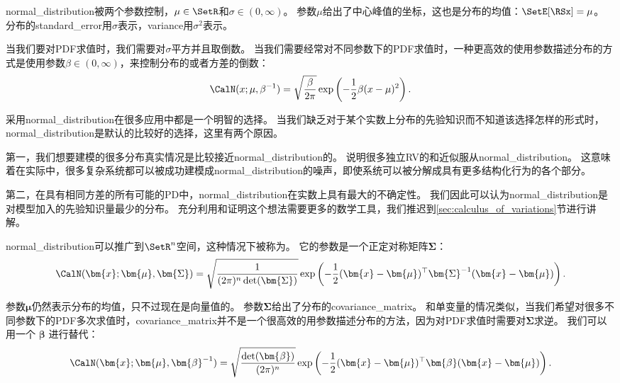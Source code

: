 \gls{normal_distribution}被两个参数控制，$\mu \in \SetR$和$\sigma \in (0, \infty)$。
参数$\mu$给出了中心峰值的坐标，这也是分布的均值：$\SetE[\RSx] = \mu$。
分布的\gls{standard_error}用$\sigma$表示，\gls{variance}用$\sigma^2$表示。

当我们要对\gls{PDF}求值时，我们需要对$\sigma$平方并且取倒数。
当我们需要经常对不同参数下的\gls{PDF}求值时，一种更高效的使用参数描述分布的方式是使用参数$\beta \in (0, \infty)$，来控制分布的或者方差的倒数：
\begin{equation}
\CalN(x; \mu, \beta^{-1}) = \sqrt{\frac{\beta}{2\pi}} \exp \left(  -\frac{1}{2}\beta (x-\mu)^2 \right).
\label{eq:3.22}
\end{equation}

采用\gls{normal_distribution}在很多应用中都是一个明智的选择。
当我们缺乏对于某个实数上分布的先验知识而不知道该选择怎样的形式时，\gls{normal_distribution}是默认的比较好的选择，这里有两个原因。


第一，我们想要建模的很多分布真实情况是比较接近\gls{normal_distribution}的。
说明很多独立\gls{RV}的和近似服从\gls{normal_distribution}。
这意味着在实际中，很多复杂系统都可以被成功建模成\gls{normal_distribution}的噪声，即使系统可以被分解成具有更多结构化行为的各个部分。

第二，在具有相同方差的所有可能的\gls{PD}中，\gls{normal_distribution}在实数上具有最大的不确定性。
我们因此可以认为\gls{normal_distribution}是对模型加入的先验知识量最少的分布。
充分利用和证明这个想法需要更多的数学工具，我们推迟到\ref{sec:calculus_of_variations}节进行讲解。

\gls{normal_distribution}可以推广到$\SetR^n$空间，这种情况下被称为。
它的参数是一个正定对称矩阵$\bm{\Sigma}$：
\begin{equation}
\label{eq:3.23}
\CalN(\bm{x}; \bm{\mu}, \bm{\Sigma}) = \sqrt{ \frac{1}{ (2\pi)^n \det(\bm{\Sigma})}}  \exp \left ( -\frac{1}{2} (\bm{x}-\bm{\mu})^\top \bm{\Sigma}^{-1} (\bm{x}- \bm{\mu}) \right).
\end{equation}

参数$\bm{\mu}$仍然表示分布的均值，只不过现在是向量值的。
参数$\bm{\Sigma}$给出了分布的\gls{covariance_matrix}。
和单变量的情况类似，当我们希望对很多不同参数下的\gls{PDF}多次求值时，\gls{covariance_matrix}并不是一个很高效的用参数描述分布的方法，因为对\gls{PDF}求值时需要对$\bm{\Sigma}$求逆。
我们可以用一个
$\bm{\beta}$ 进行替代：
\begin{equation}
\CalN(\bm{x}; \bm{\mu}, \bm{\beta}^{-1}) = \sqrt{ \frac{\det(\bm{\beta})}{ (2\pi)^n}}  \exp \left ( -\frac{1}{2} (\bm{x}-\bm{\mu})^\top \bm{\beta} (\bm{x}- \bm{\mu}) \right).
\end{equation}

